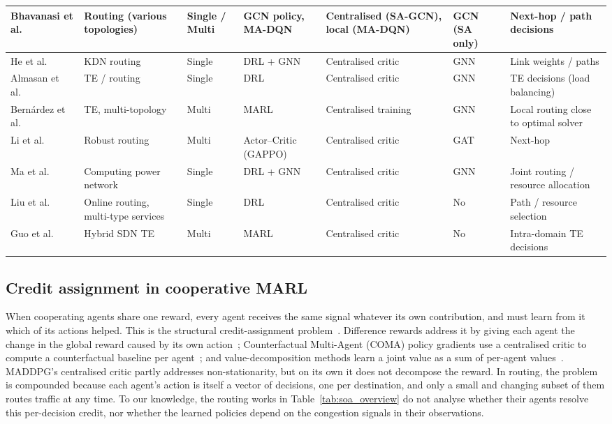 \documentclass[10pt,journal,comsoc]{IEEEtran}
\begin{document}
\begin{table}[htbp]
\begin{tabular}{|p{2.2cm}|p{2.1cm}|p{1.4cm}|p{1.9cm}|p{1.9cm}|p{1.5cm}|p{2.1cm}|}
    \hline
    Bhavanasi et al.~\cite{bhavanasi2022routing} & Routing (various topologies) & Single / Multi & GCN policy, MA-DQN & Centralised (SA-GCN), local (MA-DQN) & GCN (SA only) & Next-hop / path decisions \\
    \hline
    He et al.~\cite{he2023routing} & KDN routing & Single & DRL + GNN & Centralised critic & GNN & Link weights / paths \\
    \hline
    Almasan et al.~\cite{almasan2022deep} & TE / routing & Single & DRL & Centralised critic & GNN & TE decisions (load balancing) \\
    \hline
    Bern\'ardez et al.~\cite{bernardez2023magnneto} & TE, multi-topology & Multi & MARL & Centralised training & GNN & Local routing close to optimal solver \\
    \hline
    Li et al.~\cite{li2023gappo} & Robust routing & Multi & Actor--Critic (GAPPO) & Centralised critic & GAT & Next-hop \\
    \hline
    Ma et al.~\cite{ma2024routing} & Computing power network & Single & DRL + GNN & Centralised critic & GNN & Joint routing / resource allocation \\
    \hline
    Liu et al.~\cite{liu2023scalable} & Online routing, multi-type services & Single & DRL & Centralised critic & No & Path / resource selection \\
    \hline
    Guo et al.~\cite{guo2024distributed} & Hybrid SDN TE & Multi & MARL & Centralised critic & No & Intra-domain TE decisions \\
    \hline
  \end{tabular}
\end{table}

\subsection{Credit assignment in cooperative MARL}
When cooperating agents share one reward, every agent receives the same signal whatever its own contribution, and must learn from it which of its actions helped. This is the structural credit-assignment problem~\cite{agogino2004unifying}. Difference rewards address it by giving each agent the change in the global reward caused by its own action~\cite{agogino2004unifying}; Counterfactual Multi-Agent (COMA) policy gradients use a centralised critic to compute a counterfactual baseline per agent~\cite{foerster2018counterfactual}; and value-decomposition methods learn a joint value as a sum of per-agent values~\cite{sunehag2018value}. MADDPG's centralised critic partly addresses non-stationarity, but on its own it does not decompose the reward. In routing, the problem is compounded because each agent's action is itself a vector of decisions, one per destination, and only a small and changing subset of them routes traffic at any time. To our knowledge, the routing works in Table~\ref{tab:soa_overview} do not analyse whether their agents resolve this per-decision credit, nor whether the learned policies depend on the congestion signals in their observations.
\end{document}
